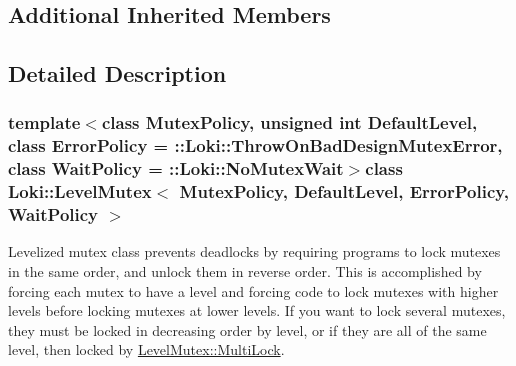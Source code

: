 \subsection*{Additional Inherited Members}


\subsection{Detailed Description}
\subsubsection*{template$<$class Mutex\+Policy, unsigned int Default\+Level, class Error\+Policy = \+::\+Loki\+::\+Throw\+On\+Bad\+Design\+Mutex\+Error, class Wait\+Policy = \+::\+Loki\+::\+No\+Mutex\+Wait$>$class Loki\+::\+Level\+Mutex$<$ Mutex\+Policy, Default\+Level, Error\+Policy, Wait\+Policy $>$}

Levelized mutex class prevents deadlocks by requiring programs to lock mutexes in the same order, and unlock them in reverse order. This is accomplished by forcing each mutex to have a level and forcing code to lock mutexes with higher levels before locking mutexes at lower levels. If you want to lock several mutexes, they must be locked in decreasing order by level, or if they are all of the same level, then locked by \hyperlink{classLoki_1_1LevelMutexInfo_adde650eae1cad8b4723e68cdb9130283}{Level\+Mutex\+::\+Multi\+Lock}.

